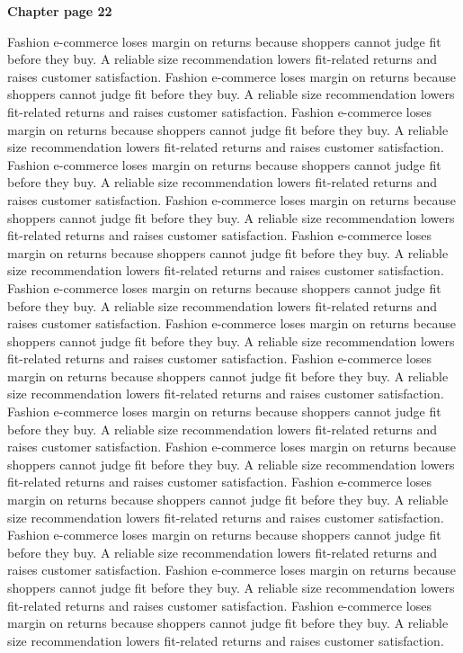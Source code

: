 \documentclass[a4paper,11pt]{article}
\begin{document}
{\headfont\bfseries\Large Chapter page 22}\par\medskip
Fashion e-commerce loses margin on returns because shoppers cannot judge fit before they buy. A reliable size recommendation lowers fit-related returns and raises customer satisfaction. Fashion e-commerce loses margin on returns because shoppers cannot judge fit before they buy. A reliable size recommendation lowers fit-related returns and raises customer satisfaction. Fashion e-commerce loses margin on returns because shoppers cannot judge fit before they buy. A reliable size recommendation lowers fit-related returns and raises customer satisfaction. Fashion e-commerce loses margin on returns because shoppers cannot judge fit before they buy. A reliable size recommendation lowers fit-related returns and raises customer satisfaction. Fashion e-commerce loses margin on returns because shoppers cannot judge fit before they buy. A reliable size recommendation lowers fit-related returns and raises customer satisfaction. 
Fashion e-commerce loses margin on returns because shoppers cannot judge fit before they buy. A reliable size recommendation lowers fit-related returns and raises customer satisfaction. Fashion e-commerce loses margin on returns because shoppers cannot judge fit before they buy. A reliable size recommendation lowers fit-related returns and raises customer satisfaction. Fashion e-commerce loses margin on returns because shoppers cannot judge fit before they buy. A reliable size recommendation lowers fit-related returns and raises customer satisfaction. Fashion e-commerce loses margin on returns because shoppers cannot judge fit before they buy. A reliable size recommendation lowers fit-related returns and raises customer satisfaction. Fashion e-commerce loses margin on returns because shoppers cannot judge fit before they buy. A reliable size recommendation lowers fit-related returns and raises customer satisfaction. 
Fashion e-commerce loses margin on returns because shoppers cannot judge fit before they buy. A reliable size recommendation lowers fit-related returns and raises customer satisfaction. Fashion e-commerce loses margin on returns because shoppers cannot judge fit before they buy. A reliable size recommendation lowers fit-related returns and raises customer satisfaction. Fashion e-commerce loses margin on returns because shoppers cannot judge fit before they buy. A reliable size recommendation lowers fit-related returns and raises customer satisfaction. Fashion e-commerce loses margin on returns because shoppers cannot judge fit before they buy. A reliable size recommendation lowers fit-related returns and raises customer satisfaction. Fashion e-commerce loses margin on returns because shoppers cannot judge fit before they buy. A reliable size recommendation lowers fit-related returns and raises customer satisfaction. \newpage
\end{document}
